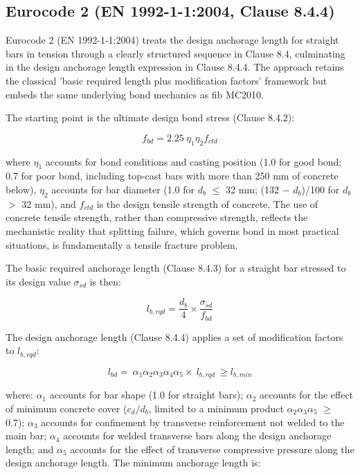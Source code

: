 \subsection{Eurocode 2 (EN 1992-1-1:2004, Clause 8.4.4)}

Eurocode 2 (EN 1992-1-1:2004) treats the design anchorage length for straight bars in tension through a clearly structured sequence in Clause 8.4, culminating in the design anchorage length expression in Clause 8.4.4. The approach retains the classical 'basic required length plus modification factors' framework but embeds the same underlying bond mechanics as fib MC2010.

The starting point is the ultimate design bond stress (Clause 8.4.2):

\begin{equation}
    f_{bd}=2.25\ {\eta }_{1}{\eta }_{2}f_{ctd}
\end{equation}

where ${\eta }_{1}$ accounts for bond conditions and casting position (1.0 for good bond; 0.7 for poor bond, including top-cast bars with more than 250 mm of concrete below), ${\eta }_{2}$ accounts for bar diameter (1.0 for $d_b$ $\leq$ 32 mm; (132 $-$ $d_b$)/100 for $d_b$ $>$ 32 mm), and $f_{ctd}$ is the design tensile strength of concrete. The use of concrete tensile strength, rather than compressive strength, reflects the mechanistic reality that splitting failure, which governs bond in most practical situations, is fundamentally a tensile fracture problem.

The basic required anchorage length (Clause 8.4.3) for a straight bar stressed to its design value ${\sigma }_{sd}$ is then:

\begin{equation}
    l_{b,rqd}=\frac{d_{b}}{4}\times \frac{{\sigma }_{sd}}{f_{bd}}
\end{equation}

The design anchorage length (Clause 8.4.4) applies a set of modification factors to $l_{b,rqd}$:

\begin{equation}
    l_{bd}=\ {\alpha }_{1}{\alpha }_{2}{\alpha }_{3}{\alpha }_{4}{\alpha }_{5}\times \ l_{b,rqd}\ \geq  l_{b,min}
\end{equation}

where: ${\alpha }_{1}$ accounts for bar shape (1.0 for straight bars); ${\alpha }_{2}$ accounts for the effect of minimum concrete cover ($c_{d}/d_{b}$, limited to a minimum product ${\alpha }_{2}{\alpha }_{3}{\alpha }_{5}$ $\geq$ 0.7); ${\alpha }_{3}$ accounts for confinement by transverse reinforcement not welded to the main bar; ${\alpha }_{4}$ accounts for welded transverse bars along the design anchorage length; and ${\alpha }_{5}$ accounts for the effect of transverse compressive pressure along the design anchorage length. The minimum anchorage length is:

